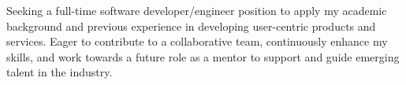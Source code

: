 

\begin{cvparagraph}
  Seeking a full-time software developer/engineer position to apply my academic background and previous experience in developing user-centric products and services. Eager to contribute to a collaborative team, continuously enhance my skills, and work towards a future role as a mentor to support and guide emerging talent in the industry.
\end{cvparagraph}